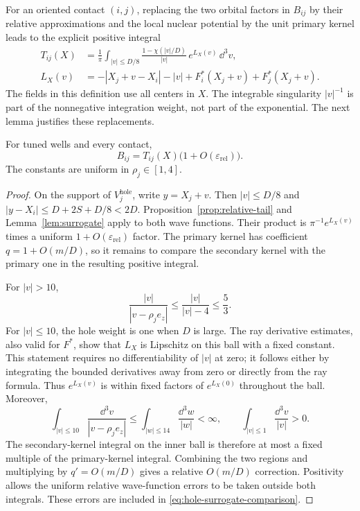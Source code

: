 For an oriented contact $(i,j)$, replacing the two orbital factors
in $B_{ij}$ by their relative
approximations and the local nuclear potential by the unit primary
kernel leads to the explicit positive integral
\begin{align}
 T_{ij}(X)
  &=\frac1\pi\int_{|v|\le D/8}
       \frac{1-\chi(|v|/D)}{|v|}\,e^{L_X(v)}\,\dd^3v,
       \label{eq:positive-hopping-integral}\\
 L_X(v)
  &=-|X_j+v-X_i|-|v|
     +F_i^*(X_j+v)+F_j^*(X_j+v).
       \label{eq:hopping-log-integrand}
\end{align}
The fields in this definition use all centers in $X$.  The
integrable singularity $|v|^{-1}$ is part of the nonnegative
integration weight, not part of the exponential. The next lemma
justifies these replacements.

\begin{lemma}
\label{lem:positive-hopping}
For tuned wells and every contact,
\begin{equation}
 B_{ij}=T_{ij}(X)
       \bigl(1+O(\varepsilon_{\mathrm{rel}})\bigr).
 \label{eq:hole-surrogate-comparison}
\end{equation}
The constants are uniform in $\rho_j\in[1,4]$.
\end{lemma}

\begin{proof}
On the support of $V_j^{\mathrm{hole}}$, write $y=X_j+v$.
Then $|v|\le D/8$ and
$|y-X_i|\le D+2S+D/8<2D$.  Proposition~\ref{prop:relative-tail}
and Lemma~\ref{lem:surrogate} apply to both wave functions.  Their
product is $\pi^{-1}e^{L_X(v)}$ times a uniform
$1+O(\varepsilon_{\mathrm{rel}})$ factor.  The primary kernel has
coefficient $q=1+O(m/D)$, so it remains to compare the secondary
kernel with the primary one in the resulting positive integral.

For $|v|>10$,
\[
 \frac{|v|}{|v-\rho_j e_z|}
   \le\frac{|v|}{|v|-4}\le\frac53.
\]
For $|v|\le10$, the hole weight is one when $D$ is large.  The
ray derivative estimates, also valid for $F^*$, show that $L_X$
is Lipschitz on this ball with a fixed constant.  This statement
requires no differentiability of $|v|$ at zero; it follows either
by integrating the bounded derivatives away from zero or directly
from the ray formula.  Thus $e^{L_X(v)}$ is within fixed factors
of $e^{L_X(0)}$ throughout the ball.  Moreover,
\[
 \int_{|v|\le10}\frac{\dd^3v}{|v-\rho_j e_z|}
  \le\int_{|w|\le14}\frac{\dd^3w}{|w|}<\infty,
 \qquad
 \int_{|v|\le1}\frac{\dd^3v}{|v|}>0.
\]
The secondary-kernel integral on the inner ball is therefore at
most a fixed multiple of the primary-kernel integral.  Combining
the two regions and multiplying by $q'=O(m/D)$ gives a relative
$O(m/D)$ correction.  Positivity allows the uniform relative
wave-function errors to be taken outside both integrals.  These
errors are included in \eqref{eq:hole-surrogate-comparison}.
\end{proof}


